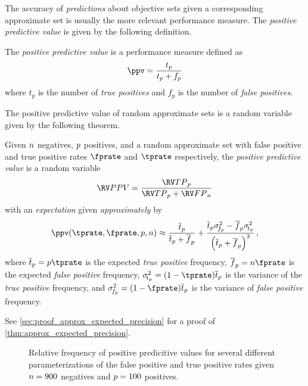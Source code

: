 \documentclass[ ../main.tex]{subfiles}
\begin{document}
The accuracy of \emph{predictions} about objective sets given a corresponding approximate set is usually the more relevant performance measure.
The \emph{positive predictive value} is given by the following definition.
\begin{definition}
The \emph{positive predictive value} is a performance measure defined as
\begin{equation}
	\ppv = \frac{t_p}{t_p + f_p}
\end{equation}
where $t_p$ is the number of \emph{true positives} and $f_p$ is the number of \emph{false positives}.
\end{definition}

The positive predictive value of random approximate sets is a random variable given by the following theorem.
\begin{theorem}
	\label{thm:approx_expected_precision}
	Given $n$ negatives, $p$ positives, and a random approximate set with false positive and true positive rates $\fprate$ and $\tprate$ respectively, the \emph{positive predictive value} is a random variable
	\begin{equation}
		\PPV = \frac{\TP_{\p}}{\TP_{\p} + \FP_{\n}}
	\end{equation}
	with an \emph{expectation} given \emph{approximately} by
	\begin{equation}
		\label{eq:approx_expected_precision}
		\ppv(\tprate, \fprate, \p, \n) \approx 
		\frac{\overline{t}_\p}{\overline{t}_\p + \overline{f}_\p} +
		\frac{\overline{t}_\p \sigma_{\!f_\p}^2 - \overline{f}_\p 
		\sigma_{\!t_\p}^2}{\left(\overline{t}_\p + \overline{f}_\p\right)^3}\,,
	\end{equation}
	where $\overline{t}_\p = \p \tprate$ is the expected \emph{true positive} frequency, $\overline{f}_\p =  \n \fprate$ is the expected \emph{false positive} frequency, $\sigma_{\!t_\p}^2 = (1-\tprate) \overline{t}_\p$ is the variance of the \emph{true positive} frequency, and $\sigma_{\!f_\p}^2 = (1-\fprate) \overline{t}_\p$ is the variance of \emph{false positive} frequency.
\end{theorem}
See \cref{sec:proof_approx_expected_precision} for a proof of 
\cref{thm:approx_expected_precision}.

\begin{figure}
	\def\svgwidth{\columnwidth/2}
	\centering
	\captionsetup{justification=centering}
	\caption
	{
		Relative frequency of positive predicitive values for several different parameterizations of the false positive and true positive rates given $n = 900$ negatives and $p=100$ positives.
	}    
	
	\label{fig:prec_vs_fprate_and_fnrate}
\end{figure}
\end{document}
